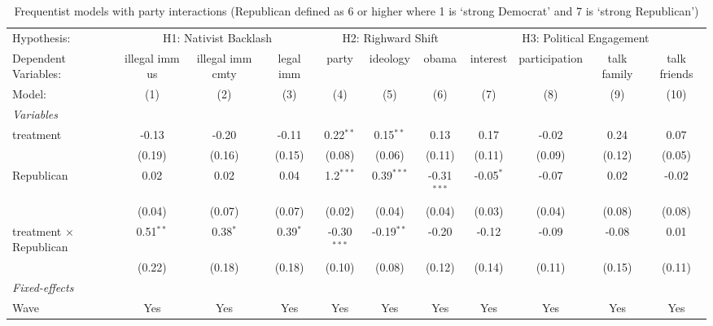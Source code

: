 
\begin{table}[htbp]
   \caption{\label{tab:rep_5} Frequentist models with party interactions (Republican defined as 6 or higher where 1 is `strong Democrat' and 7 is `strong Republican')}
   \centering
   \begin{tabular}{lcccccccccc}
      \tabularnewline \midrule \midrule
      Hypothesis: & \multicolumn{3}{c}{H1: Nativist Backlash} & \multicolumn{3}{c}{H2: Righward Shift} & \multicolumn{4}{c}{H3: Political Engagement} \\ 
      Dependent Variables:           & illegal imm us & illegal imm cmty & legal imm  & party         & ideology     & obama         & interest    & participation & talk family & talk friends\\  
      Model:                         & (1)            & (2)              & (3)        & (4)           & (5)          & (6)           & (7)         & (8)           & (9)         & (10)\\  
      \midrule
      \emph{Variables}\\
      treatment                      & -0.13          & -0.20            & -0.11      & 0.22$^{**}$   & 0.15$^{**}$  & 0.13          & 0.17        & -0.02         & 0.24        & 0.07\\   
                                     & (0.19)         & (0.16)           & (0.15)     & (0.08)        & (0.06)       & (0.11)        & (0.11)      & (0.09)        & (0.12)      & (0.05)\\   
      Republican                     & 0.02           & 0.02             & 0.04       & 1.2$^{***}$   & 0.39$^{***}$ & -0.31$^{***}$ & -0.05$^{*}$ & -0.07         & 0.02        & -0.02\\   
                                     & (0.04)         & (0.07)           & (0.07)     & (0.02)        & (0.04)       & (0.04)        & (0.03)      & (0.04)        & (0.08)      & (0.08)\\   
      treatment $\times$ Republican  & 0.51$^{**}$    & 0.38$^{*}$       & 0.39$^{*}$ & -0.30$^{***}$ & -0.19$^{**}$ & -0.20         & -0.12       & -0.09         & -0.08       & 0.01\\   
                                     & (0.22)         & (0.18)           & (0.18)     & (0.10)        & (0.08)       & (0.12)        & (0.14)      & (0.11)        & (0.15)      & (0.11)\\   
      \midrule
      \emph{Fixed-effects}\\
      Wave                           & Yes            & Yes              & Yes        & Yes           & Yes          & Yes           & Yes         & Yes           & Yes         & Yes\\  

\end{tabular}
\end{table}
